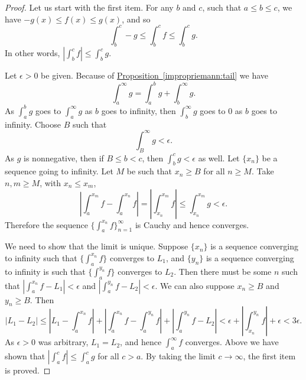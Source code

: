 \documentclass[12pt]{book}
\newcommand{\abs}[1]{\left\lvert {#1} \right\rvert}
\theoremstyle{plain}
\theoremstyle{remark}
\theoremstyle{definition}
\theoremstyle{exercise}
\theoremstyle{example}
\newcommand{\propref}[1]{\hyperref[#1]{Proposition~\ref*{#1}}}
\begin{document}
\begin{proof}
Let us start with the first item.
For any $b$ and $c$, such that $a \leq b \leq c$, we have 
$-g(x) \leq f(x) \leq g(x)$, and so
\begin{equation*}
\int_b^c -g \leq \int_b^c f \leq \int_b^c g  .
\end{equation*}
In other words, $\abs{\int_b^c f} \leq \int_b^c g$.

Let $\epsilon > 0$ be given.  Because
of \propref{impropriemann:tail} we have
\begin{equation*}
\int_a^\infty g =
\int_a^b g +
\int_b^\infty g .
\end{equation*}
As $\int_a^b g$ goes to
$\int_a^\infty g$ as $b$ goes to infinity, then
$\int_b^\infty g$ goes to 0 as $b$ goes to infinity.  Choose $B$
such that
\begin{equation*}
\int_B^\infty g < \epsilon .
\end{equation*}
As $g$ is nonnegative, then if $B \leq b < c$, then
$\int_b^c g < \epsilon$ as well.
Let $\{ x_n \}$ be a sequence going to infinity.  Let $M$ be such that
$x_n \geq B$ for all $n \geq M$.  Take $n, m \geq M$,
with $x_n \leq x_m$,
\begin{equation*}
\abs{\int_a^{x_m} f - \int_a^{x_n} f} 
=
\abs{\int_{x_n}^{x_m} f} 
\leq \int_{x_n}^{x_m} g < \epsilon .
\end{equation*}
Therefore the sequence $\{ \int_a^{x_n} f \}_{n=1}^\infty$ is Cauchy and hence converges.

We need to show that the limit is unique.  Suppose $\{ x_n \}$ is a sequence
converging to infinity such that
$\{ \int_a^{x_n} f \}$ converges to $L_1$, and $\{ y_n \}$ is a sequence
converging to infinity is such that
$\{ \int_a^{y_n} f \}$ converges to $L_2$.  Then there must be some $n$ such
that
$\abs{\int_a^{x_n} f - L_1} < \epsilon$ and 
$\abs{\int_a^{y_n} f - L_2} < \epsilon$.  We can also suppose $x_n \geq B$
and $y_n \geq B$.  Then
\begin{equation*}
\abs{L_1 - L_2} \leq
\abs{L_1 - \int_a^{x_n} f}
+
\abs{\int_a^{x_n} f- \int_a^{y_n} f}
+
\abs{\int_a^{y_n} f - L_2}
<
\epsilon
+
\abs{\int_{x_n}^{y_n} f}
+
\epsilon
<
3 \epsilon.
\end{equation*}
As $\epsilon > 0$ was arbitrary, $L_1 = L_2$, and hence
$\int_a^\infty f$ converges.
Above we have shown that $\abs{\int_a^c f} \leq \int_a^c g$ for all $c > a$.
By taking the limit $c \to \infty$, the first item is proved.


\end{proof}
\end{document}
